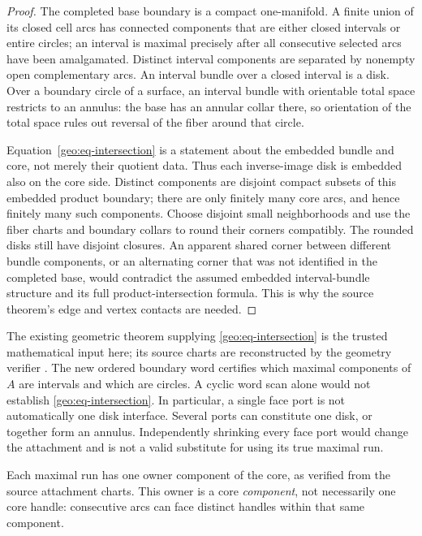 \begin{proof}
The completed base boundary is a compact one-manifold.  A finite union of
its closed cell arcs has connected components that are either closed
intervals or entire circles; an interval is maximal precisely after all
consecutive selected arcs have been amalgamated.  Distinct interval
components are separated by nonempty open complementary arcs.  An
interval bundle over a closed interval is a disk.  Over a boundary circle
of a surface, an interval bundle with orientable total space restricts to
an annulus: the base has an annular collar there, so orientation of the
total space rules out reversal of the fiber around that circle.

Equation~\eqref{geo:eq-intersection} is a statement about the embedded
bundle and core, not merely their quotient data.  Thus each inverse-image
disk is embedded also on the core side.  Distinct components are disjoint
compact subsets of this embedded product boundary; there are only finitely
many core arcs, and hence finitely many such components.  Choose disjoint
small neighborhoods and use the fiber charts and boundary collars to
round their corners compatibly.  The rounded disks still have disjoint
closures.  An apparent shared corner between different bundle components,
or an alternating corner that was not identified in the completed base,
would contradict the assumed embedded interval-bundle structure and its
full product-intersection formula.  This is why the source theorem's edge
and vertex contacts are needed.
\end{proof}

The existing geometric theorem supplying
\eqref{geo:eq-intersection} is the trusted mathematical input here; its
source charts are reconstructed by the geometry verifier
\cite{ProveIt2026}.  The new ordered boundary word certifies which maximal
components of $A$ are intervals and which are circles.  A cyclic word scan
alone would not establish \eqref{geo:eq-intersection}.  In particular, a
single face port is not automatically one disk interface.  Several ports
can constitute one disk, or together form an annulus.  Independently
shrinking every face port would change the attachment and is not a valid
substitute for using its true maximal run.

Each maximal run has one owner component of the core, as verified from the
source attachment charts.  This owner is a core \emph{component}, not
necessarily one core handle: consecutive arcs can face distinct handles
within that same component.

